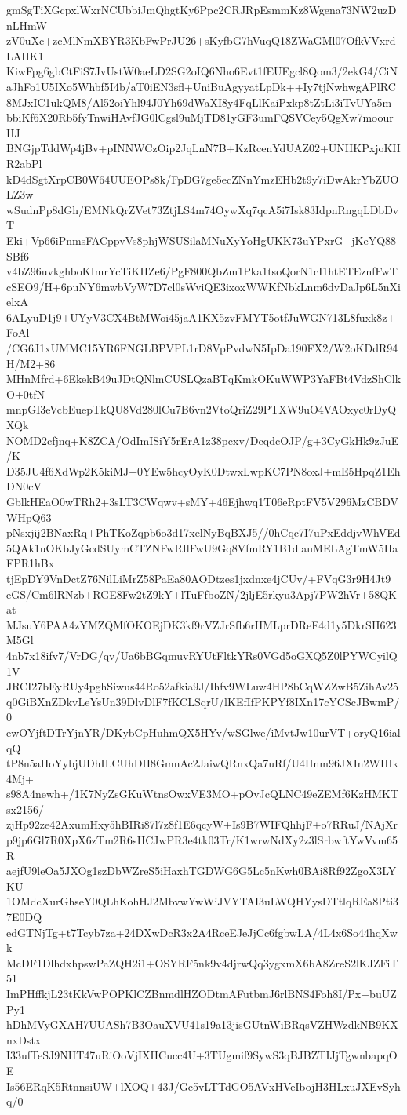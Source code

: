 gmSgTiXGcpxlWxrNCUbbiJmQhgtKy6Ppc2CRJRpEsmmKz8Wgena73NW2uzDnLHmW
zV0uXc+zcMlNmXBYR3KbFwPrJU26+sKyfbG7hVuqQ18ZWaGMl07OfkVVxrdLAHK1
KiwFpg6gbCtFiS7JvUstW0aeLD2SG2oIQ6Nho6Evt1fEUEgcl8Qom3/2ekG4/CiN
aJhFo1U5IXo5Whbf5I4b/aT0iEN3sfl+UniBuAgyyatLpDk++Iy7tjNwhwgAPlRC
8MJxIC1ukQM8/Al52oiYhl94J0Yh69dWaXI8y4FqLlKaiPxkp8tZtLi3iTvUYa5m
bbiKf6X20Rb5fyTnwiHAvfJG0lCgsl9uMjTD81yGF3umFQSVCey5QgXw7moourHJ
BNGjpTddWp4jBv+pINNWCzOip2JqLnN7B+KzRcenYdUAZ02+UNHKPxjoKHR2abPl
kD4dSgtXrpCB0W64UUEOPs8k/FpDG7ge5ecZNnYmzEHb2t9y7iDwAkrYbZUOLZ3w
wSudnPp8dGh/EMNkQrZVet73ZtjLS4m74OywXq7qcA5i7Isk83IdpnRngqLDbDvT
Eki+Vp66iPnmsFACppvVs8phjWSUSilaMNuXyYoHgUKK73uYPxrG+jKeYQ88SBf6
v4bZ96uvkghboKImrYcTiKHZe6/PgF800QbZm1Pka1tsoQorN1cI1htETEznfFwT
cSEO9/H+6puNY6mwbVyW7D7cl0sWviQE3ixoxWWKfNbkLnm6dvDaJp6L5nXielxA
6ALyuD1j9+UYyV3CX4BtMWoi45jaA1KX5zvFMYT5otfJuWGN713L8fuxk8z+FoAl
/CG6J1xUMMC15YR6FNGLBPVPL1rD8VpPvdwN5IpDa190FX2/W2oKDdR94H/M2+86
MHnMfrd+6EkekB49uJDtQNlmCUSLQzaBTqKmkOKuWWP3YaFBt4VdzShClkO+0tfN
mnpGI3eVcbEuepTkQU8Vd280lCu7B6vn2VtoQriZ29PTXW9uO4VAOxyc0rDyQXQk
NOMD2cfjnq+K8ZCA/OdImISiY5rErA1z38pcxv/DcqdcOJP/g+3CyGkHk9zJuE/K
D35JU4f6XdWp2K5kiMJ+0YEw5hcyOyK0DtwxLwpKC7PN8oxJ+mE5HpqZ1EhDN0cV
GblkHEaO0wTRh2+3sLT3CWqwv+sMY+46Ejhwq1T06eRptFV5V296MzCBDVWHpQ63
pNsxjij2BNaxRq+PhTKoZqpb6o3d17xelNyBqBXJ5//0hCqc7I7uPxEddjvWhVEd
5QAk1uOKbJyGcdSUymCTZNFwRIlFwU9Gq8VfmRY1B1dlauMELAgTmW5HaFPR1hBx
tjEpDY9VnDctZ76NilLiMrZ58PaEa80AODtzes1jxdnxe4jCUv/+FVqG3r9H4Jt9
eGS/Cm6lRNzb+RGE8Fw2tZ9kY+lTuFfboZN/2jljE5rkyu3Apj7PW2hVr+58QKat
MJsuY6PAA4zYMZQMfOKOEjDK3kf9rVZJrSfb6rHMLprDReF4d1y5DkrSH623M5Gl
4nb7x18ifv7/VrDG/qv/Ua6bBGqmuvRYUtFltkYRs0VGd5oGXQ5Z0lPYWCyilQ1V
JRCI27bEyRUy4pghSiwus44Ro52afkia9J/Ihfv9WLuw4HP8bCqWZZwB5ZihAv25
q0GiBXnZDkvLeYsUn39DlvDlF7fKCLSqrU/lKEfIfPKPYf8IXn17cYCScJBwmP/0
ewOYjftDTrYjnYR/DKybCpHuhmQX5HYv/wSGlwe/iMvtJw10urVT+oryQ16ialqQ
tP8n5aHoYybjUDhILCUhDH8GmnAc2JaiwQRnxQa7uRf/U4Hnm96JXIn2WHIk4Mj+
s98A4newh+/1K7NyZsGKuWtnsOwxVE3MO+pOvJcQLNC49eZEMf6KzHMKTsx2156/
zjHp92ze42AxumHxy5hBIRi87l7z8f1E6qcyW+Is9B7WIFQhhjF+o7RRuJ/NAjXr
p9jp6Gl7R0XpX6zTm2R6sHCJwPR3e4tk03Tr/K1wrwNdXy2z3lSrbwftYwVvm65R
aejfU9leOa5JXOg1szDbWZreS5iHaxhTGDWG6G5Lc5nKwh0BAi8Rf92ZgoX3LYKU
1OMdcXurGhseY0QLhKohHJ2MbvwYwWiJVYTAI3uLWQHYysDTtlqREa8Pti37E0DQ
edGTNjTg+t7Tcyb7za+24DXwDcR3x2A4RceEJeJjCc6fgbwLA/4L4x6So44hqXwk
McDF1DlhdxhpswPaZQH2i1+OSYRF5nk9v4djrwQq3ygxmX6bA8ZreS2lKJZFiT51
ImPHffkjL23tKkVwPOPKlCZBnmdlHZODtmAFutbmJ6rlBNS4Foh8I/Px+buUZPy1
hDhMVyGXAH7UUASh7B3OauXVU41s19a13jisGUtnWiBRqsVZHWzdkNB9KXnxDstx
I33ufTeSJ9NHT47uRiOoVjIXHCucc4U+3TUgmif9SywS3qBJBZTIJjTgwnbapqOE
Is56ERqK5RtnnsiUW+lXOQ+43J/Gc5vLTTdGO5AVxHVeIbojH3HLxuJXEvSyhq/0
